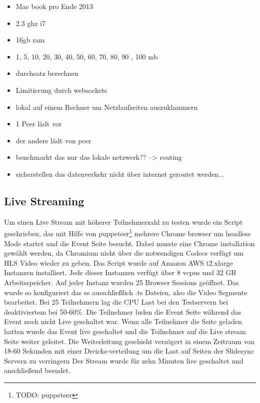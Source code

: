 \begin{itemize}
	\item Mac book pro Ende 2013
	\item 2.3 ghz i7
	\item 16gb ram
	\item 1, 5, 10, 20, 30, 40, 50, 60, 70, 80, 90 , 100 mb
	\item durchsatz berechnen
	\item Limitierung durch websockets
	\item lokal auf einem Rechner um Netzlaufzeiten auszuklammern
	\item 1 Peer lädt vor
	\item der andere lädt von peer
	\item benchmarkt das nur das lokale netzwerk?? --> routing
	\item sicherstellen das datenverkehr nicht über internet geroutet werden...
\end{itemize}

\subsection{Live Streaming}
Um einen Live Stream mit höherer Teilnehmerzahl zu testen wurde ein Script geschrieben, das mit Hilfe von puppeteer\footnote{TODO: puppeteer} mehrere Chrome browser um headless Mode startet und die Event Seite besucht. Dabei musste eine Chrome installation gewählt werden, da Chromium nicht über die notwendigen Codecs verfügt um HLS Video wieder zu geben. 
Das Script wurde auf Amazon AWS t2.xlarge Instanzen installiert. Jede dieser Instanzen verfügt über 8 vcpus und 32 GB Arbeitsspeicher. Auf jeder Instanz wurden 25 Browser Sessions geöffnet.  Das \cdn wurde so konfiguriert das es ausschließlich .ts Dateien, also die Video Segmente bearbeitet. Bei 25 Teilnehmern lag die CPU Last bei den Testservern bei deaktiviertem \pTp \cdn bei 50-60\%. 
Die Teilnehmer luden die Event Seite während das Event noch nicht Live geschaltet war. Wenn alle Teilnehmer die Seite geladen hatten wurde das Event live geschaltet und die Teilnehmer auf die Live stream Seite weiter geleitet. Die Weiterleitung geschieht verzögert in einem Zeitraum von 18-60 Sekunden mit einer Dreicks-verteilung um die Last auf Seiten der Slidesync Servern zu verringern Der Stream wurde für zehn Minuten live geschaltet und anschließend beendet.

